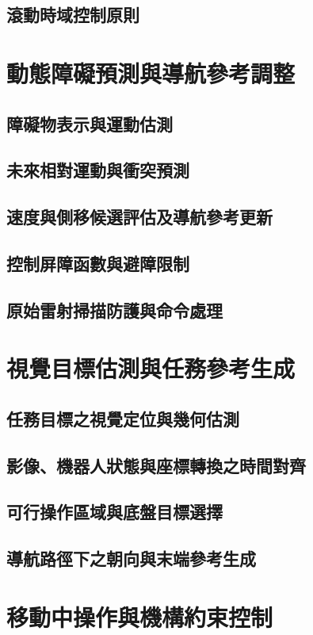 \subsection{滾動時域控制原則}

\section{動態障礙預測與導航參考調整}
\subsection{障礙物表示與運動估測}
\subsection{未來相對運動與衝突預測}
\subsection{速度與側移候選評估及導航參考更新}
\subsection{控制屏障函數與避障限制}
\subsection{原始雷射掃描防護與命令處理}

\section{視覺目標估測與任務參考生成}
\subsection{任務目標之視覺定位與幾何估測}
\subsection{影像、機器人狀態與座標轉換之時間對齊}
\subsection{可行操作區域與底盤目標選擇}
\subsection{導航路徑下之朝向與末端參考生成}

\section{移動中操作與機構約束控制}
